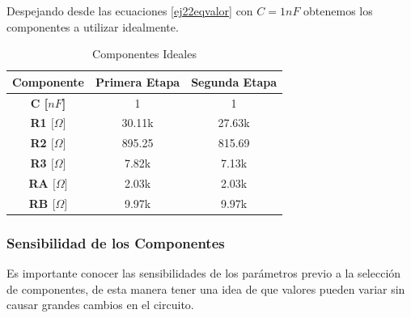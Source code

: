 Despejando desde las ecuaciones \ref{ej22eqvalor} con $C = 1nF$ obtenemos los componentes a utilizar idealmente.

\begin{table}[H]
\centering
\begin{tabular}{@{}ccc@{}}
\toprule
\textbf{Componente}                     & \textbf{Primera Etapa} & \textbf{Segunda Etapa} \\ \midrule
\textbf{C {[}$nF${]}}                     & 1                      & 1                      \\
\textbf{R1 ${[}\Omega{]}$} & 30.11k                 & 27.63k                 \\
\textbf{R2 ${[}\Omega{]}$} & 895.25                 & 815.69                 \\
\textbf{R3 ${[}\Omega{]}$} & 7.82k                  & 7.13k                  \\
\textbf{RA ${[}\Omega{]}$} & 2.03k                  & 2.03k                  \\
\textbf{RB ${[}\Omega{]}$} & 9.97k                  & 9.97k                  \\ \bottomrule
\end{tabular}
\caption{Componentes Ideales}
\label{ej22tvalt}
\end{table}

\subsubsection{Sensibilidad de los Componentes}

Es importante conocer las sensibilidades de los parámetros previo a la selección de componentes, de esta manera tener una idea de que valores pueden variar sin causar grandes cambios en el circuito. 


